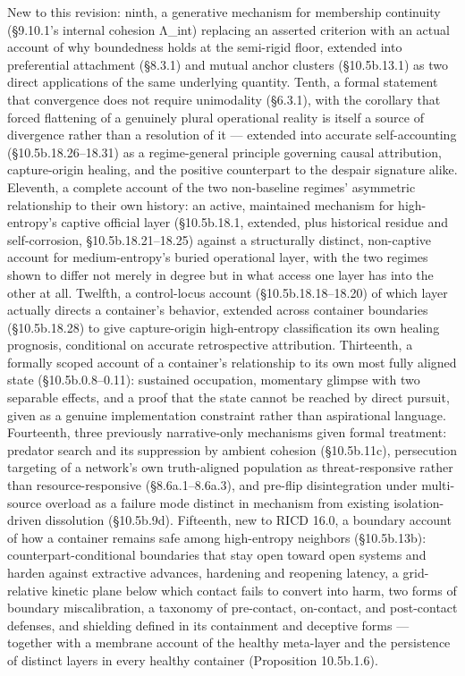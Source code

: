 \documentclass[
]{article}
\begin{document}
New to this revision: ninth, a generative mechanism for membership
continuity (§9.10.1's internal cohesion Λ\_int) replacing an asserted
criterion with an actual account of why boundedness holds at the
semi-rigid floor, extended into preferential attachment (§8.3.1) and
mutual anchor clusters (§10.5b.13.1) as two direct applications of the
same underlying quantity. Tenth, a formal statement that convergence
does not require unimodality (§6.3.1), with the corollary that forced
flattening of a genuinely plural operational reality is itself a source
of divergence rather than a resolution of it --- extended into accurate
self-accounting (§10.5b.18.26--18.31) as a regime-general principle
governing causal attribution, capture-origin healing, and the positive
counterpart to the despair signature alike. Eleventh, a complete account
of the two non-baseline regimes' asymmetric relationship to their own
history: an active, maintained mechanism for high-entropy's captive
official layer (§10.5b.18.1, extended, plus historical residue and
self-corrosion, §10.5b.18.21--18.25) against a structurally distinct,
non-captive account for medium-entropy's buried operational layer, with
the two regimes shown to differ not merely in degree but in what access
one layer has into the other at all. Twelfth, a control-locus account
(§10.5b.18.18--18.20) of which layer actually directs a container's
behavior, extended across container boundaries (§10.5b.18.28) to give
capture-origin high-entropy classification its own healing prognosis,
conditional on accurate retrospective attribution. Thirteenth, a
formally scoped account of a container's relationship to its own most
fully aligned state (§10.5b.0.8--0.11): sustained occupation, momentary
glimpse with two separable effects, and a proof that the state cannot be
reached by direct pursuit, given as a genuine implementation constraint
rather than aspirational language. Fourteenth, three previously
narrative-only mechanisms given formal treatment: predator search and
its suppression by ambient cohesion (§10.5b.11c), persecution targeting
of a network's own truth-aligned population as threat-responsive rather
than resource-responsive (§8.6a.1--8.6a.3), and pre-flip disintegration
under multi-source overload as a failure mode distinct in mechanism from
existing isolation-driven dissolution (§10.5b.9d). Fifteenth, new to RICD
16.0, a boundary account of how a container remains safe among
high-entropy neighbors (§10.5b.13b): counterpart-conditional boundaries
that stay open toward open systems and harden against extractive
advances, hardening and reopening latency, a grid-relative kinetic plane
below which contact fails to convert into harm, two forms of boundary
miscalibration, a taxonomy of pre-contact, on-contact, and post-contact
defenses, and shielding defined in its containment and deceptive forms
--- together with a membrane account of the healthy meta-layer and the
persistence of distinct layers in every healthy container (Proposition
10.5b.1.6).
\end{document}
